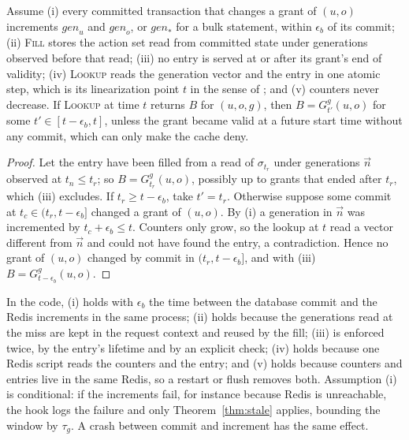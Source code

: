 \documentclass[sigconf,review,anonymous]{acmart}
\begin{document}
\begin{proposition}\label{prop:fresh}
Assume (i) every committed transaction that changes a grant of $(u,o)$ increments $\mathit{gen}_u$ and
$\mathit{gen}_o$, or $\mathit{gen}_\ast$ for a bulk statement, within $\epsilon_b$ of its commit; (ii)
\textsc{Fill} stores the action set read from committed state under generations observed before that read;
(iii) no entry is served at or after its grant's end of validity; (iv) \textsc{Lookup} reads the generation vector
and the entry in one atomic step, which is its linearization point $t$ in the sense of
\cite{herlihy1990linearizability}; and (v) counters never decrease. If \textsc{Lookup} at time $t$ returns $B$ for
$(u,o,g)$, then $B=G^g_{t'}(u,o)$ for some $t'\in[t-\epsilon_b,t]$, unless the grant became valid at a future
start time without any commit, which can only make the cache deny.
\end{proposition}
\begin{proof}
Let the entry have been filled from a read of $\sigma_{t_r}$ under generations $\vec{n}$ observed at
$t_n\le t_r$; so $B=G^g_{t_r}(u,o)$, possibly up to grants that ended after $t_r$, which (iii) excludes. If
$t_r\ge t-\epsilon_b$, take $t'=t_r$. Otherwise suppose some commit at $t_c\in(t_r,t-\epsilon_b]$ changed a grant
of $(u,o)$. By (i) a generation in $\vec{n}$ was incremented by $t_c+\epsilon_b\le t$. Counters only grow, so the
lookup at $t$ read a vector different from $\vec{n}$ and could not have found the entry, a contradiction. Hence
no grant of $(u,o)$ changed by commit in $(t_r,t-\epsilon_b]$, and with (iii) $B=G^g_{t-\epsilon_b}(u,o)$.
\end{proof}

In the code, (i) holds with $\epsilon_b$ the time between the database commit and the Redis increments in the
same process; (ii) holds because the generations read at the miss are kept in the request context and reused
by the fill; (iii) is enforced twice, by the entry's lifetime and by an explicit check; (iv) holds because one Redis
script reads the counters and the entry; and (v) holds because counters and entries live in the same Redis, so a
restart or flush removes both. Assumption (i) is conditional: if the increments fail, for instance because Redis
is unreachable, the hook logs the failure and only Theorem~\ref{thm:stale} applies, bounding the window by
$\tau_g$. A crash between commit and increment has the same effect.
\end{document}
